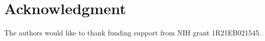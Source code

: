 \documentclass[journal]{IEEEtran}
\begin{document}
\section*{Acknowledgment}

The authors would like to thank funding support from NIH grant 1R21EB021545.







\end{document}
